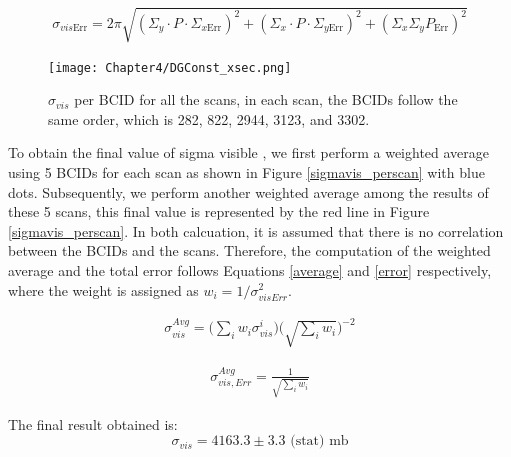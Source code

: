 \begin{equation}
\sigma_{vis\text{Err}}= 2 \pi \sqrt{ (\Sigma_{y} \cdot P \cdot \Sigma_{x\text{Err}})^{2} + (\Sigma_{x} \cdot P \cdot \Sigma_{y \text{Err}})^{2} + (\Sigma_{x} \Sigma_{y} P_{\text{Err}})^{2} }
\end{equation}

\begin{center}
  \begin{figure}[h!]
    \centering
    \texttt{[image: Chapter4/DGConst\_xsec.png]}
    \caption[$\sigma_{vis}$ per BCID for all scans]{ $\sigma_{vis}$ per BCID for all the scans,  in each scan, the BCIDs follow the same order, which is 282, 822, 2944, 3123, and 3302.}
    \label{sigmavis_perbcid}
  \end{figure}
\end{center}

To obtain the final value of sigma visible , we first perform a weighted average using 5 BCIDs for each scan as shown in Figure \ref{sigmavis_perscan} with blue dots. Subsequently, we perform another weighted average among the results of these 5 scans, this final value is represented by the red line in Figure \ref{sigmavis_perscan}. In both calcuation, it is assumed that there is no correlation between the BCIDs and the scans. Therefore, the computation of the weighted average and the total error  follows Equations \ref{average} and \ref{error} respectively, where the weight is assigned as $w_{i} = 1/\sigma_{visErr}^{2}$. 


\begin{eqnarray}
\sigma_{vis}^{Avg}=\Biggl(\displaystyle\sum_{i} w_{i}\sigma_{vis}^{i} \Biggr)\Biggl(\sqrt{ \displaystyle\sum_{i} w_{i}} \Biggr)^{-2}
\label{average}
\end{eqnarray}

\begin{eqnarray}
\sigma_{vis,Err}^{Avg}=\frac{1}{\sqrt{ \displaystyle\sum_{i} w_{i}}} 
\label{error}
\end{eqnarray}

The final result obtained is:
\begin{equation}
\sigma_{vis}=4163.3 \pm 3.3 \text{ (stat)  mb}
\end{equation}

